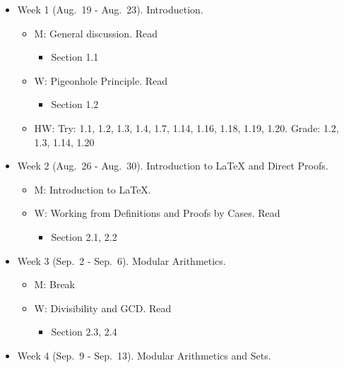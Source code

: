 \documentclass[
]{article}
\providecommand{\tightlist}{%
  \setlength{\itemsep}{0pt}\setlength{\parskip}{0pt}}
\begin{document}
\begin{itemize}
\item
  Week 1 (Aug.~19 - Aug.~23). Introduction.

  \begin{itemize}
  \tightlist
  \item
    M: General discussion. Read

    \begin{itemize}
    \tightlist
    \item
      Section 1.1
    \end{itemize}
  \item
    W: Pigeonhole Principle. Read

    \begin{itemize}
    \tightlist
    \item
      Section 1.2
    \end{itemize}
  \item
    HW: Try: 1.1, 1.2, 1.3, 1.4, 1.7, 1.14, 1.16, 1.18, 1.19, 1.20. Grade: 1.2, 1.3, 1.14, 1.20
  \end{itemize}
\item
  Week 2 (Aug.~26 - Aug.~30). Introduction to LaTeX and Direct Proofs.

  \begin{itemize}
  \tightlist
  \item
    M: Introduction to LaTeX.
  \item
    W: Working from Definitions and Proofs by Cases. Read

    \begin{itemize}
    \tightlist
    \item
      Section 2.1, 2.2
    \end{itemize}
  \end{itemize}
\item
  Week 3 (Sep.~2 - Sep.~6). Modular Arithmetics.

  \begin{itemize}
  \tightlist
  \item
    M: Break
  \item
    W: Divisibility and GCD. Read

    \begin{itemize}
    \tightlist
    \item
      Section 2.3, 2.4
    \end{itemize}
  \end{itemize}
\item
  Week 4 (Sep.~9 - Sep.~13). Modular Arithmetics and Sets.


\end{itemize}
\end{document}
